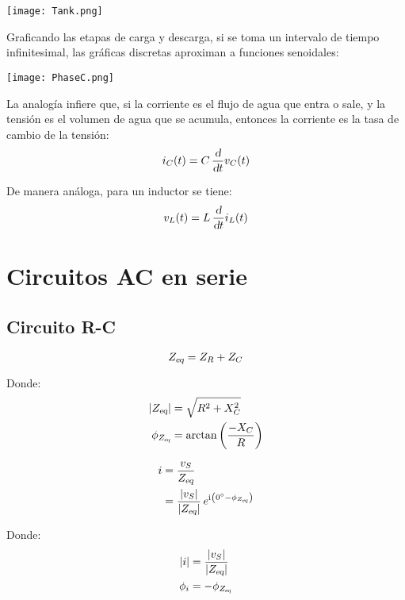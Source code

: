 \documentclass[a5paper,12pt,twoside]{book}
\begin{document}
\begin{center}
    \texttt{[image: Tank.png]}
\end{center}

Graficando las etapas de carga y descarga, si se toma un intervalo de tiempo infinitesimal, las gráficas discretas aproximan a funciones senoidales:

\begin{center}
    \texttt{[image: PhaseC.png]}
\end{center}

La analogía infiere que, si la corriente es el flujo de agua que entra o sale, y la tensión es el volumen de agua que se acumula, entonces la corriente es la tasa de cambio de la tensión:
\begin{equation*}
    i_C(t) = C \, \frac{\textsl{d}}{\textsl{d} t} v_C(t)
\end{equation*}

De manera análoga, para un inductor se tiene:
\begin{equation*}
    v_L(t) = L \, \frac{\textsl{d}}{\textsl{d} t} i_L(t)
\end{equation*}


\section{Circuitos AC en serie}


\subsection*{Circuito R-C}

\begin{equation*}
    {{Z}_\textsl{{eq}}} = Z_R + Z_C
\end{equation*}

Donde:
\begin{align*}
    {\left| {{{Z}_\textsl{{eq}}}} \right|} &= \sqrt{R^2 + X_C^2}
    \\
    \phi_{{{Z}_\textsl{{eq}}}} &= \arctan{\left(\dfrac{-X_C}{R}\right)}
\end{align*}

\begin{align*}
    i &= \frac{v_S}{{{Z}_\textsl{{eq}}}}
    \\
    &= \frac{{\left| {v_S} \right|}}{{\left| {{{Z}_\textsl{{eq}}}} \right|}} \, e^{\mathrm{i}\mkern1mu \left(\ang{0} - \phi_{{{Z}_\textsl{{eq}}}}\right)}
\end{align*}

Donde:
\begin{align*}
    {\left| {i} \right|} &= \frac{{\left| {v_S} \right|}}{{\left| {{{Z}_\textsl{{eq}}}} \right|}}
    \\
    \phi_i &= - \phi_{{{Z}_\textsl{{eq}}}}
\end{align*}
\end{document}
